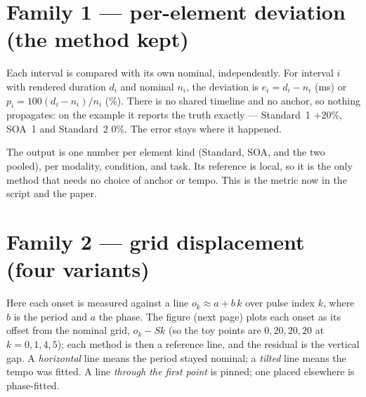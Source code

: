 \documentclass[11pt]{article}
\begin{document}
\section*{Family 1 --- per-element deviation (the method kept)}

Each interval is compared with its own nominal, independently. For interval $i$
with rendered duration $d_i$ and nominal $n_i$, the deviation is $e_i = d_i-n_i$
(ms) or $p_i = 100(d_i-n_i)/n_i$ (\%). There is no shared timeline and no anchor,
so nothing propagates: on the example it reports the truth exactly --- Standard~1
$+20\%$, SOA~1 and Standard~2 $0\%$. The error stays where it happened.

\begin{center}
\end{center}

The output is one number per element kind (Standard, SOA, and the two pooled),
per modality, condition, and task. Its reference is local, so it is the only
method that needs no choice of anchor or tempo. This is the metric now in the
script and the paper.

\section*{Family 2 --- grid displacement (four variants)}

Here each onset is measured against a line $o_k \approx a + b\,k$ over pulse index
$k$, where $b$ is the period and $a$ the phase. The figure (next page) plots each
onset as its offset from the nominal grid, $o_k - S k$ (so the toy points are
$0,20,20,20$ at $k=0,1,4,5$); each method is then a reference line, and the
residual is the vertical gap. A \emph{horizontal} line means the period stayed
nominal; a \emph{tilted} line means the tempo was fitted. A line \emph{through the
first point} is pinned; one placed elsewhere is phase-fitted.
\end{document}

